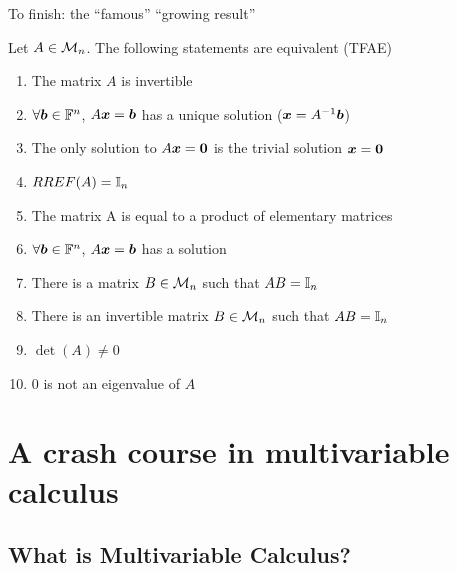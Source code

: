 \documentclass[aspectratio=169]{beamer}\usepackage[]{graphicx}\usepackage[]{xcolor}
\begin{document}
\begin{frame}{To finish: the ``famous'' ``growing result''}
\begin{importanttheorem}
Let $A\in\mathcal{M}_n$. The following statements are equivalent (TFAE)
\begin{enumerate}
\item The matrix $A$ is invertible
\item $\forall\bm{b}\in\mathbb{F}^n$, $A\bm{x} = \bm{b}$ has a unique solution ($\bm{x}=A^{-1}\bm{b}$)
\item The only solution to $A\bx = \b0$ is the trivial solution $\bx = \b0$
\item $RREF(A)=\mathbb{I}_n$
\item The matrix A is equal to a product of elementary matrices
\item $\forall\bm{b}\in\mathbb{F}^n$, $A\bm{x} = \bm{b}$ has a solution
\item There is a matrix $B\in\mathcal{M}_n$ such that $AB = \mathbb{I}_n$
\item There is an invertible matrix $B\in\mathcal{M}_n$ such that $AB = \mathbb{I}_n$
\item $\det(A)\neq 0$
\item $0$ is not an eigenvalue of $A$
\end{enumerate}
\end{importanttheorem}
\end{frame}



\section{A crash course in multivariable calculus}


\subsection{What is Multivariable Calculus?}
\end{document}
